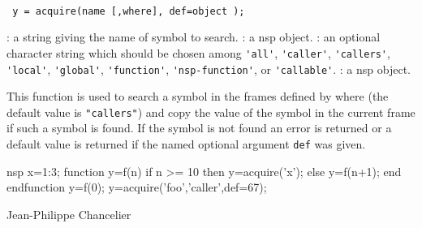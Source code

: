 
\begin{mandesc}
   \\
\end{mandesc}

\begin{calling_sequence}
\begin{verbatim}
 y = acquire(name [,where], def=object );
\end{verbatim}
\end{calling_sequence}
\begin{parameters}
  \begin{varlist}
    : a string giving the name of symbol to search.
    : a nsp object.
    : an optional character string which should be chosen 
    among \verb+'all'+, \verb+'caller'+, \verb+'callers'+, \verb+'local'+,
    \verb+'global'+, \verb+'function'+, \verb+'nsp-function'+, or 
    \verb+'callable'+.
    : a nsp object.
  \end{varlist}
\end{parameters}

\begin{mandescription}
  This function is used to search a symbol in the frames defined by where (the default value 
  is \verb+"callers"+) and copy the value of the symbol in the current frame if such a symbol is found. If the symbol is not found an error is returned or a default value is returned if 
  the named optional argument \verb+def+ was given. 
\end{mandescription}

\begin{examples}
\begin{mintednsp}{nsp}
x=1:3;
function y=f(n)
 if n >= 10 then y=acquire('x'); 
 else y=f(n+1);
 end 
endfunction 
y=f(0);
y=acquire('foo','caller',def=67);
\end{mintednsp}
\end{examples}

\begin{manseealso}
\end{manseealso}

\begin{authors}
  Jean-Philippe Chancelier
\end{authors}
